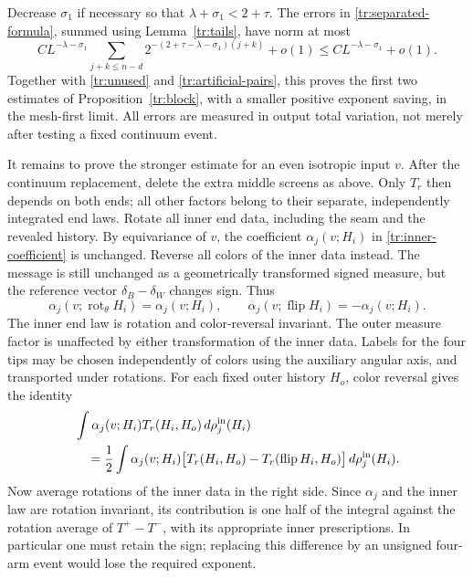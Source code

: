 Decrease $\sigma_1$ if necessary so that
$\lambda+\sigma_1<2+\tau$.  The errors in
\eqref{tr:separated-formula}, summed using
Lemma~\ref{tr:tails}, have norm at most
\begin{equation}
 C L^{-\lambda-\sigma_1}
      \sum_{j+k\le n-d}
             2^{-(2+\tau-\lambda-\sigma_1)(j+k)}+o(1)
       \le C L^{-\lambda-\sigma_1}+o(1).
\label{tr:rank-error-sum}
\end{equation}
Together with \eqref{tr:unused} and
\eqref{tr:artificial-pairs}, this proves the first two estimates of
Proposition~\ref{tr:block}, with a smaller positive exponent saving,
in the mesh-first limit.  All errors are measured in output total
variation, not merely after testing a fixed continuum event.

It remains to prove the stronger estimate for an even isotropic input
$v$.  After the continuum replacement, delete the extra middle screens
as above.  Only $T_r$ then depends on both ends; all other factors
belong to their separate, independently integrated end laws.
Rotate all inner end data, including the seam and the revealed
history.  By equivariance of $v$, the coefficient
$\alpha_j(v;H_i)$ in \eqref{tr:inner-coefficient} is unchanged.  Reverse
all colors of the inner data instead.  The message is still unchanged
as a geometrically transformed signed measure, but the reference
vector $\delta_B-\delta_W$ changes sign.  Thus
\begin{equation}
 \alpha_j(v;\operatorname{rot}_\theta H_i)=\alpha_j(v;H_i),
 \qquad
 \alpha_j(v;\operatorname{flip} H_i)=-\alpha_j(v;H_i).
\label{tr:coefficient-symmetry}
\end{equation}
The inner end law is rotation and color-reversal invariant.  The outer
measure factor is unaffected by either transformation of the inner
data.  Labels for the four tips may be chosen independently of colors
using the auxiliary angular axis, and transported under rotations.
For each fixed outer history $H_o$, color reversal gives the identity
\begin{equation}
\begin{aligned}
 &\int \alpha_j(v;H_i)T_r(H_i,H_o)\,d\rho_j^{\rm in}(H_i)\\
 &\quad=\frac12\int \alpha_j(v;H_i)
    \big[T_r(H_i,H_o)-T_r(\operatorname{flip}H_i,H_o)\big]
                                   \,d\rho_j^{\rm in}(H_i).
\end{aligned}
\label{tr:flip-integral}
\end{equation}
Now average rotations of the inner data in the right side.  Since
$\alpha_j$ and the inner law are rotation invariant, its contribution
is one half of the integral against the rotation average of
$T^+-T^-$, with its appropriate inner prescriptions.  In particular
one must retain the sign; replacing this difference by an unsigned
four-arm event would lose the required exponent.

